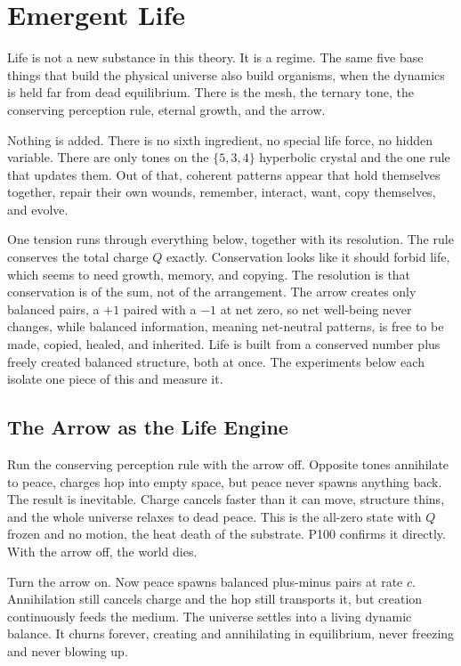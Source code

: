 \section{Emergent Life}

Life is not a new substance in this theory. It is a regime. The same five base things that build the physical universe also build organisms, when the dynamics is held far from dead equilibrium. There is the mesh, the ternary tone, the conserving perception rule, eternal growth, and the arrow.

Nothing is added. There is no sixth ingredient, no special life force, no hidden variable. There are only tones on the $\{5,3,4\}$ hyperbolic crystal and the one rule that updates them. Out of that, coherent patterns appear that hold themselves together, repair their own wounds, remember, interact, want, copy themselves, and evolve.

One tension runs through everything below, together with its resolution. The rule conserves the total charge $Q$ exactly. Conservation looks like it should forbid life, which seems to need growth, memory, and copying. The resolution is that conservation is of the sum, not of the arrangement. The arrow creates only balanced pairs, a $+1$ paired with a $-1$ at net zero, so net well-being never changes, while balanced information, meaning net-neutral patterns, is free to be made, copied, healed, and inherited. Life is built from a conserved number plus freely created balanced structure, both at once. The experiments below each isolate one piece of this and measure it.

\subsection{The Arrow as the Life Engine}

Run the conserving perception rule with the arrow off. Opposite tones annihilate to peace, charges hop into empty space, but peace never spawns anything back. The result is inevitable. Charge cancels faster than it can move, structure thins, and the whole universe relaxes to dead peace. This is the all-zero state with $Q$ frozen and no motion, the heat death of the substrate. P100 confirms it directly. With the arrow off, the world dies.

Turn the arrow on. Now peace spawns balanced plus-minus pairs at rate $c$. Annihilation still cancels charge and the hop still transports it, but creation continuously feeds the medium. The universe settles into a living dynamic balance. It churns forever, creating and annihilating in equilibrium, never freezing and never blowing up.

